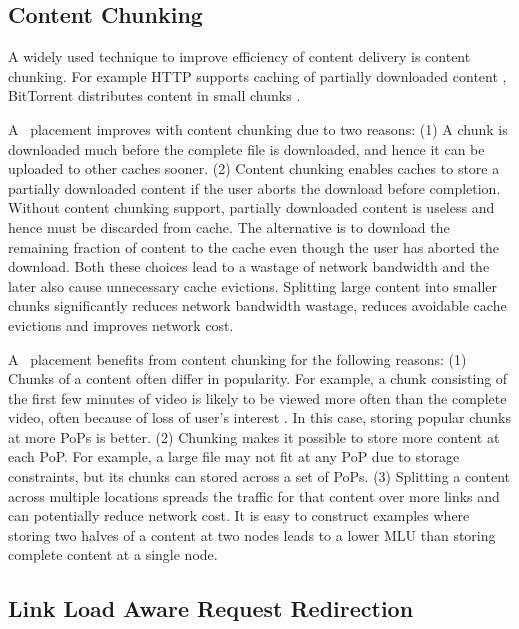 

\eat
{


\subsection{Content Chunking}

A widely used technique to improve efficiency of content delivery is content chunking. For example HTTP supports caching of partially downloaded content \cite{rfc2616}, BitTorrent distributes content in small chunks \cite{bittorrentprotocol}.

A \unplanned\ placement improves with content chunking due to two reasons: (1) A chunk is downloaded much before the complete file is downloaded, and hence it can be uploaded to other caches sooner. (2) Content chunking enables caches to store a partially downloaded content if the user aborts the download before completion. Without content chunking support, partially downloaded content is useless and hence must be discarded from cache. The alternative is to download the remaining fraction of content to the cache even though the user has aborted the download. Both these choices lead to a wastage of network bandwidth and the later also cause unnecessary cache evictions.  Splitting large content into smaller chunks significantly reduces network bandwidth wastage, reduces avoidable cache evictions and improves network cost.

A \unplanned\ placement benefits from content chunking for the following reasons: (1) Chunks of a content often differ in popularity.  For example, a chunk consisting of the first few minutes of video is likely to be viewed more often than the complete video, often because of loss of user's interest \cite{youtubestudy}. In this case, storing popular chunks at more PoPs is better.  (2) Chunking makes it possible to store more content at each PoP. For example, a large file may not  fit at any PoP due to storage constraints,  but its chunks can stored across a set of PoPs. 
(3) Splitting a content across multiple locations spreads the traffic for that content over more links and can potentially reduce network cost. It is easy to construct examples where storing two halves of a content at two nodes leads to a lower MLU than storing complete content at a single node.


\subsection{Link Load Aware Request Redirection}

}
